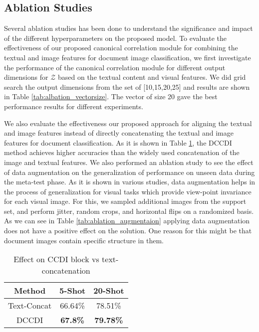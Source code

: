 \subsection{Ablation Studies}\label{tab:ablationstudies}
 Several ablation studies has been done to understand the significance and impact of the different hyperparameters on the proposed model. To evaluate the effectiveness of our proposed canonical correlation module for combining the textual and image features for document image classification, we first investigate the performance of the canonical correlation  module for different output dimensions for $\mathcal{Z}$ based on the textual content and visual features.
We did grid search the output dimensions from the set of [10,15,20,25] and results are shown in Table \ref{tab:albation_vectorsize}. The vector of size 20 gave the best performance results for different experiments. 

We also evaluate the effectiveness our proposed approach for aligning the textual and image features instead of directly concatenating the textual and image features for document classification. As it is shown in Table \ref{tab:albation_concatvs_ccdi}, the DCCDI method achieves higher accuracies than the widely used concatenation of the image and textual features. 
We also performed an ablation study to see the effect of data augmentation on the generalization of performance on unseen data during the meta-test phase. As it is shown in various studies, data augmentation helps in the process of generalization for visual tasks which provide view-point invariance for each visual image. For this, we sampled additional images from the
support set, and perform jitter, random crops, and horizontal flips on a randomized basis. As we can see in Table \ref{tab:ablation_augmentaion} applying data augmentation does not have a positive effect on the solution. One reason for this might be that document images contain specific structure in them.



\begin{table}[ht]
{\small
\centering
\begin{tabular}{ccc} 
\toprule
\textbf{ Method} &\textbf{5-Shot} &\textbf{20-Shot}\\
\midrule
Text-Concat & 66.64\%  &  78.51\%  \\
DCCDI & \textbf{67.8\% } & \textbf{79.78\% } \\
\hline
\bottomrule
\end{tabular}
\caption{Effect on CCDI block vs text-concatenation}
\label{tab:albation_concatvs_ccdi}
}
\end{table}




